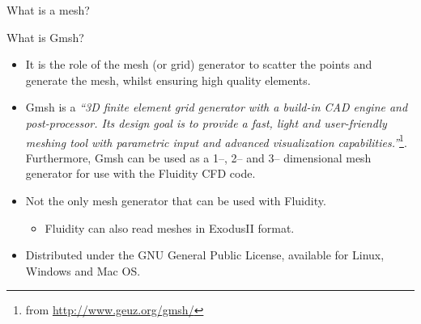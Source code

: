 \documentclass[t]{beamer}
\begin{document}
\begin{frame}{What is a mesh?}
\end{frame}


\begin{frame}{What is Gmsh?}
\begin{itemize}
\item It is the role of the mesh (or grid) generator to scatter the points and generate the mesh, whilst ensuring high quality elements.
\item Gmsh is a \emph{``3D finite element grid generator with a build-in CAD engine and post-processor. Its design goal is to provide a fast, light and user-friendly meshing tool with parametric input and advanced visualization capabilities.''}\footnote{from \url{http://www.geuz.org/gmsh/}}. Furthermore, Gmsh can be used as a 1--, 2-- and 3-- dimensional mesh generator for use with the Fluidity CFD code.
\item Not the only mesh generator that can be used with Fluidity.
\begin{itemize}
   \item Fluidity can also read meshes in ExodusII format.
\end{itemize}
\item Distributed under the GNU General Public License, available for Linux, Windows and Mac OS.
\end{itemize}
\end{frame}
\end{document}
